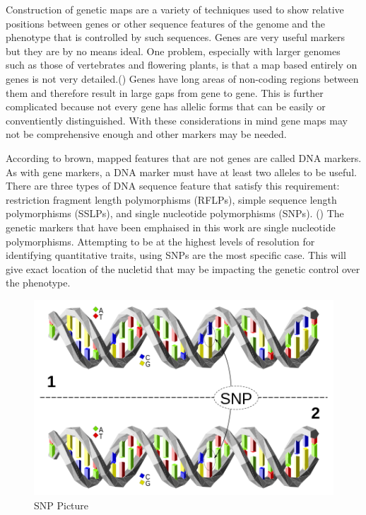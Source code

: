 \documentclass[11pt,]{book}
\theoremstyle{definition}
\theoremstyle{definition}
\theoremstyle{remark}
\begin{document}
Construction of genetic maps are a variety of techniques used to show
relative positions between genes or other sequence features of the
genome and the phenotype that is controlled by such sequences. Genes are
very useful markers but they are by no means ideal. One problem,
especially with larger genomes such as those of vertebrates and
flowering plants, is that a map based entirely on genes is not very
detailed.(\cite{brown2006genomes}) Genes have long areas of non-coding
regions between them and therefore result in large gaps from gene to
gene. This is further complicated because not every gene has allelic
forms that can be easily or conventiently distinguished. With these
considerations in mind gene maps may not be comprehensive enough and
other markers may be needed.

According to brown, mapped features that are not genes are called DNA
markers. As with gene markers, a DNA marker must have at least two
alleles to be useful. There are three types of DNA sequence feature that
satisfy this requirement: restriction fragment length polymorphisms
(RFLPs), simple sequence length polymorphisms (SSLPs), and single
nucleotide polymorphisms (SNPs). (\cite{brown2006genomes}) The genetic
markers that have been emphaised in this work are single nucleotide
polymorphisms. Attempting to be at the highest levels of resolution for
identifying quantitative traits, using SNPs are the most specific case.
This will give exact location of the nucletid that may be impacting the
genetic control over the phenotype.

\begin{figure}

{\centering \includegraphics[width=0.8\linewidth]{images/SNP_Picture} 

}

\caption{SNP Picture}\label{fig:Snp-Pic}
\end{figure}
\end{document}

